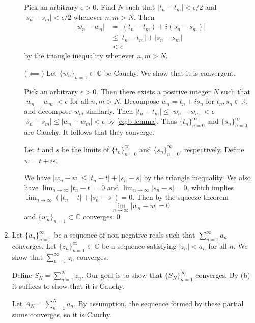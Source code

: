 \documentclass[oneside]{article}
\newcommand\abs[1]{\left|#1\right|}
\newcommand\bbC{\mathbb{C}}
\newcommand\bbR{\mathbb{R}}
\begin{document}
\begin{enumerate}[label=\textbf{(\alph*)}]
\begin{itemize}[leftmargin=34pt]
      Pick an arbitrary $\epsilon > 0$. Find $N$ such that
      $\abs{t_n - t_m} < \epsilon/2$ and $\abs{s_n - s_m} < \epsilon/2$
      whenever $n, m > N$. Then \begin{align*}
        \abs{w_n - w_n} &= \abs{(t_n - t_m) + i(s_n - s_m)} \\
        &\leq \abs{t_n - t_m} + \abs{s_n - s_m} \\
        &< \epsilon
      \end{align*} by the triangle inequality whenever $n, m > N$.

      \item[($\impliedby$)] Let $\{w_n\}_{n=1} \subset \bbC$ be Cauchy. We show
        that it is convergent.

        Pick an arbitrary $\epsilon > 0$. Then there exists a positive integer
        $N$ such that $\abs{w_n - w_m} < \epsilon$ for all $n, m > N$. Decompose
        $w_n = t_n + is_n$ for $t_n, s_n \in \bbR$, and decompose $w_m$
        similarly. Then $\abs{t_n - t_m} \leq \abs{w_n - w_m} < \epsilon$
        $\abs{s_n - s_m} \leq \abs{w_n - w_m} < \epsilon$ by \eqref{eq:b-lemma}.
        Thus $\{t_n\}_{n=0}^\infty$ and $\{s_n\}_{n=0}^\infty$ are Cauchy. It
        follows that they converge.

        Let $t$ and $s$ be the limits of $\{t_n\}_{n=0}^\infty$ and
        $\{s_n\}_{n=0}^\infty$, respectively. Define $w = t + is$.

        We have $\abs{w_n - w} \leq \abs{t_n - t} + \abs{s_n - s}$ by the
        triangle inequality. We also have $\lim_{n\to\infty}\abs{t_n - t} = 0$
        and $\lim_{n\to\infty}\abs{s_n - s} = 0$, which implies
        $\lim_{n\to\infty}(\abs{t_n - t} + \abs{s_n - s}) = 0$. Then by the
        squeeze theorem
        \[
          \lim_{n\to\infty}\abs{w_n - w} = 0
        \] and $\{w_n\}_{n=1} \subset \bbC$ converges.\qed
    \end{itemize}

    \item Let $\{a_n\}_{n=1}^\infty$ be a sequence of non-negative reals such
      that $\sum_{n=1}^\infty a_n$ converges. Let
      $\{z_n\}_{n=1}^\infty \subset \bbC$ be a sequence satisfying
      $\abs{z_n} < a_n$ for all $n$. We show that $\sum_{n=1}^\infty z_n$
      converges.

      Define $S_N = \sum_{n=1}^N z_n$. Our goal is to show that
      $\{S_N\}_{n=1}^\infty$ converges. By (b) it suffices to show that it is
      Cauchy.

      Let $A_N = \sum_{n=1}^N a_n$. By assumption, the sequence formed by these
      partial sums converges, so it is Cauchy.


\end{enumerate}
\end{document}
